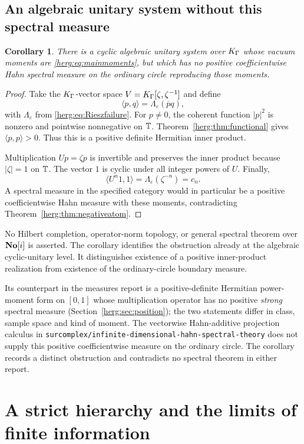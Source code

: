 \documentclass[11pt,letterpaper]{article}
\newtheorem{corollary}[theorem]{Corollary}
\theoremstyle{definition}
\newcommand{\eps}{\varepsilon}
\newcommand{\repo}[1]{\nolinkurl{#1}}%
\numberwithin{equation}{section}
\begin{document}
\subsection{An algebraic unitary system without this spectral measure}

\begin{corollary}\label{herg:cor:unitary}
There is a cyclic algebraic unitary system over $K_\Gamma$ whose vacuum moments are \eqref{herg:eq:mainmoments}, but which has no positive coefficientwise Hahn spectral measure on the ordinary circle reproducing those moments.
\end{corollary}
\begin{proof}
Take the $K_\Gamma$-vector space $V=K_\Gamma[\zeta,\zeta^{-1}]$ and define
\[
 \langle p,q\rangle=\Lambda_\eps(\overline p q),
\]
with $\Lambda_\eps$ from \eqref{herg:eq:Rieszfailure}. For $p\ne0$, the coherent function $|p|^2$ is nonzero and pointwise nonnegative on $\mathbb T$. Theorem~\ref{herg:thm:functional} gives $\langle p,p\rangle>0$. Thus this is a positive definite Hermitian inner product.

Multiplication $Up=\zeta p$ is invertible and preserves the inner product because $|\zeta|=1$ on $\mathbb T$. The vector $1$ is cyclic under all integer powers of $U$. Finally,
\[
 \langle U^n1,1\rangle=\Lambda_\eps(\zeta^{-n})=c_n.
\]
A spectral measure in the specified category would in particular be a positive coefficientwise Hahn measure with these moments, contradicting Theorem~\ref{herg:thm:negativeatom}.
\end{proof}

No Hilbert completion, operator-norm topology, or general spectral theorem over $\mathbf{No}[i]$ is asserted. The corollary identifies the obstruction already at the algebraic cyclic-unitary level. It distinguishes existence of a positive inner-product realization from existence of the ordinary-circle boundary measure.

Its counterpart in the measures report is a positive-definite Hermitian power-moment form on $[0,1]$ whose multiplication operator has no positive \emph{strong} spectral measure (Section~\ref{herg:sec:position}); the two statements differ in class, sample space and kind of moment. The vectorwise Hahn-additive projection calculus in \repo{surcomplex/infinite-dimensional-hahn-spectral-theory} does not supply this positive coefficientwise measure on the ordinary circle. The corollary records a distinct obstruction and contradicts no spectral theorem in either report.

\section{A strict hierarchy and the limits of finite information}
\label{herg:sec:hierarchy}
\end{document}
